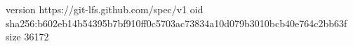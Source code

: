 version https://git-lfs.github.com/spec/v1
oid sha256:b602eb14b54395b7bf910ff0c5703ac73834a10d079b3010bcb40e764c2bb63f
size 36172
